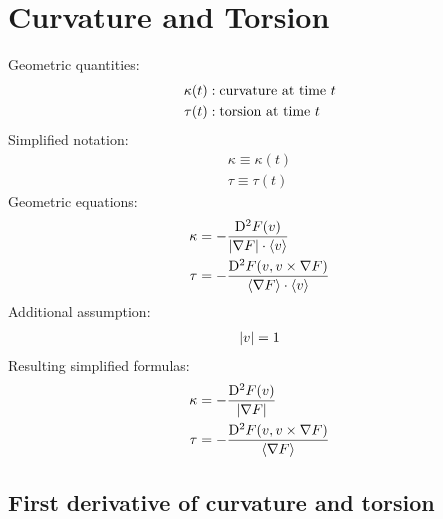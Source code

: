\section{Curvature and Torsion}


Geometric quantities:
\begin{subequations}
\begin{align}
\kappa( t )  &:  \text{curvature at time $ t $}\\
\tau( t )    &:  \text{torsion at time $ t $}
\end{align}
\end{subequations}
Simplified notation:
\begin{subequations}
\begin{align}
\kappa  \equiv  \kappa( t )\\
\tau    \equiv  \tau( t )
\end{align}
\end{subequations}
Geometric equations:
\begin{subequations}
\begin{align}
\kappa   &=   -\frac{ \mathrm{D}^{ 2 }F( v ) }{ \lvert  \nabla F  \rvert \cdot \langle  v  \rangle }\\
\tau     &=   -\frac{ \mathrm{D}^{ 2 }F( v, v \times \nabla F ) }{ \langle  \nabla F  \rangle \cdot \langle  v  \rangle }
\end{align}
\end{subequations}
Additional assumption:
\begin{align}
    \lvert  v  \rvert  =  1
\end{align}
Resulting simplified formulas:
\begin{align}
    \kappa   &=
    - \frac{ \mathrm{D}^{ 2 }F( v ) }{ \lvert  \nabla F  \rvert }  \\
    \tau   &=
    - \frac{ \mathrm{D}^{ 2 }F( v, v \times \nabla F ) }{ \langle  \nabla F  \rangle }
\end{align}


\subsection{First derivative of curvature and torsion}



